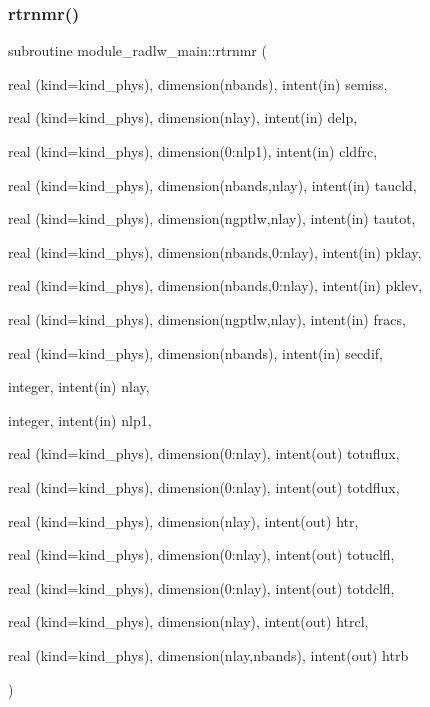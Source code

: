\subsubsection{\texorpdfstring{rtrnmr()}{rtrnmr()}}
{\footnotesize\ttfamily subroutine module\+\_\+radlw\+\_\+main\+::rtrnmr (\begin{DoxyParamCaption}\item[{real (kind=kind\+\_\+phys), dimension(nbands), intent(in)}]{semiss,  }\item[{real (kind=kind\+\_\+phys), dimension(nlay), intent(in)}]{delp,  }\item[{real (kind=kind\+\_\+phys), dimension(0\+:nlp1), intent(in)}]{cldfrc,  }\item[{real (kind=kind\+\_\+phys), dimension(nbands,nlay), intent(in)}]{taucld,  }\item[{real (kind=kind\+\_\+phys), dimension(ngptlw,nlay), intent(in)}]{tautot,  }\item[{real (kind=kind\+\_\+phys), dimension(nbands,0\+:nlay), intent(in)}]{pklay,  }\item[{real (kind=kind\+\_\+phys), dimension(nbands,0\+:nlay), intent(in)}]{pklev,  }\item[{real (kind=kind\+\_\+phys), dimension(ngptlw,nlay), intent(in)}]{fracs,  }\item[{real (kind=kind\+\_\+phys), dimension(nbands), intent(in)}]{secdif,  }\item[{integer, intent(in)}]{nlay,  }\item[{integer, intent(in)}]{nlp1,  }\item[{real (kind=kind\+\_\+phys), dimension(0\+:nlay), intent(out)}]{totuflux,  }\item[{real (kind=kind\+\_\+phys), dimension(0\+:nlay), intent(out)}]{totdflux,  }\item[{real (kind=kind\+\_\+phys), dimension(nlay), intent(out)}]{htr,  }\item[{real (kind=kind\+\_\+phys), dimension(0\+:nlay), intent(out)}]{totuclfl,  }\item[{real (kind=kind\+\_\+phys), dimension(0\+:nlay), intent(out)}]{totdclfl,  }\item[{real (kind=kind\+\_\+phys), dimension(nlay), intent(out)}]{htrcl,  }\item[{real (kind=kind\+\_\+phys), dimension(nlay,nbands), intent(out)}]{htrb }\end{DoxyParamCaption})\hspace{0.3cm}{\ttfamily [private]}}


